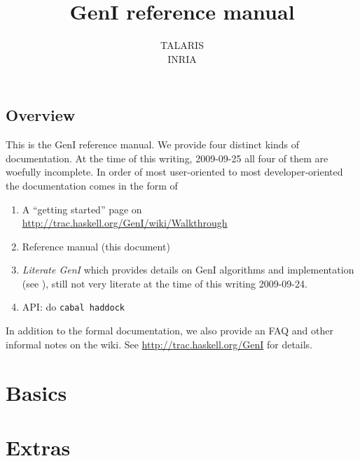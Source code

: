 \documentclass[a4paper,11pt]{report}
\begin{document}
\title{GenI reference manual}
\author{TALARIS\\INRIA}

\maketitle
\tableofcontents


\chapter{Overview}

This is the GenI reference manual.  We provide four distinct kinds of
documentation.  At the time of this writing, 2009-09-25 all four of them
are woefully incomplete.  In order of most user-oriented to most
developer-oriented the documentation comes in the form of

\begin{enumerate}
\item A ``getting started'' page on\\
      \url{http://trac.haskell.org/GenI/wiki/Walkthrough}
\item Reference manual (this document)
\item \textit{Literate GenI} which provides details on GenI
      algorithms and implementation (see \cite{literateGeni}),
      still not very literate at the time of this writing
      2009-09-24.
\item API: do \verb!cabal haddock!
\end{enumerate}

In addition to the formal documentation, we also provide an FAQ and
other informal notes on the wiki.  See
\url{http://trac.haskell.org/GenI} for details.

\part{Basics}






\part{Extras}




{


}
\end{document}
